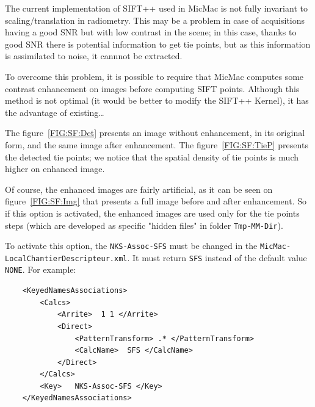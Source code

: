 The current implementation of SIFT++ used in MicMac is not fully invariant to scaling/translation in radiometry. This may be a problem in case of acquisitions having a good SNR but with low contrast in the scene; in this case, thanks to good SNR there is potential information to get tie points, but as this information is assimilated to noise, it cannnot be extracted.

To overcome this problem, it is possible to require that MicMac computes some contrast enhancement on images before computing SIFT points. Although this method is not optimal (it would be better to modify the SIFT++ Kernel), it has the advantage of existing\dots



The figure~\ref{FIG:SF:Det} presents an image without enhancement, in its original form, and the same image after enhancement. The figure~\ref{FIG:SF:TieP} presents the detected tie points; we notice that the spatial density of tie points is much higher on enhanced image.

Of course, the enhanced images are fairly artificial, as it can be seen on figure~\ref{FIG:SF:Img} that presents a full image before and after enhancement. So if this option is activated, the enhanced images are used only for the tie points steps (which are developed as specific "hidden files" in folder {\tt Tmp-MM-Dir}).


To activate this option, the {\tt NKS-Assoc-SFS} must be changed in the {\tt MicMac-LocalChantierDescripteur.xml}. It must return {\tt SFS} instead of the default value {\tt NONE}. For example:

\begin{verbatim}
    <KeyedNamesAssociations>
        <Calcs>
            <Arrite>  1 1 </Arrite>
            <Direct>
                <PatternTransform> .* </PatternTransform>
                <CalcName>  SFS </CalcName>
            </Direct>
        </Calcs>
        <Key>   NKS-Assoc-SFS </Key>
    </KeyedNamesAssociations>
\end{verbatim}


